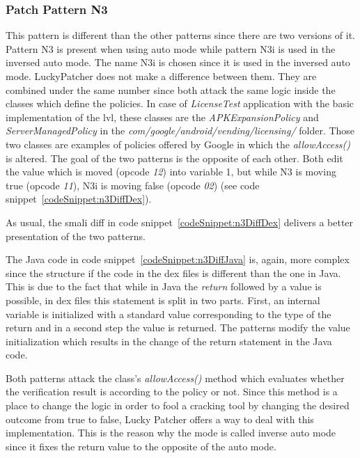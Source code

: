 \subsubsection{Patch Pattern N3}
This pattern is different than the other patterns since there are two versions of it.
Pattern N3 is present when using auto mode while pattern N3i is used in the inversed auto mode.
The name N3i is chosen since it is used in the inversed auto mode.
LuckyPatcher does not make a difference between them.
They are combined under the same number since both attack the same logic inside the classes which define the policies.
In case of \textit{LicenseTest}
 application with the basic implementation of the \gls{lvl}, these classes are the \textit{APKExpansionPolicy} and \textit{ServerManagedPolicy} in the  \textit{com/google/android/vending/licensing/} folder.
Those two classes are examples of policies offered by Google \cite{developersLicensingReference} in which the \textit{allowAccess()} is altered.
\newline
The goal of the two patterns is the opposite of each other.
Both edit the value which is moved (opcode \textit{12}) into variable 1, but while N3 is moving true (opcode \textit{11}), N3i is moving false (opcode \textit{02}) (see code snippet~\ref{codeSnippet:n3DiffDex}).
\newline

As usual, the smali diff in code snippet~\ref{codeSnippet:n3DiffDex} delivers a better presentation of the two patterns.
\newline

The Java code in code snippet~\ref{codeSnippet:n3DiffJava} is, again, more complex since the structure if the code in the \gls{dex} files is different than the one in Java.
This is due to the fact that while in Java the \textit{return} followed by a value is possible, in \gls{dex} files this statement is split in two parts.
First, an internal variable is initialized with a standard value corresponding to the type of the return and in a second step the value is returned.
The patterns modify the value initialization which results in the change of the return statement in the Java code.
\newline

Both patterns attack the class's \textit{allowAccess()} method which evaluates whether the verification result is according to the policy or not.
Since this method is a place to change the logic in order to fool a cracking tool by changing the desired outcome from true to false, Lucky Patcher offers a way to deal with this implementation.
This is the reason why the mode is called inverse auto mode since it fixes the return value to the opposite of the auto mode.



